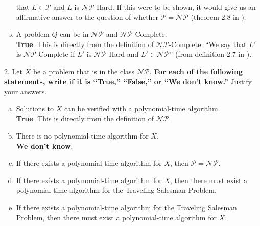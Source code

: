 \documentclass{scrartcl}
\begin{document}
\begin{flushleft}
\begin{enumerate}[(a)]
            that $L \in \mathcal{P}$ and $L$ is $\mathcal{NP}$-Hard. If this were to be shown, it
            would give us an affirmative answer to the question of whether $\mathcal{P} =
            \mathcal{NP}$ (theorem 2.8 in \cite{modernapp}).
        \item A problem $Q$ can be in $\mathcal{NP}$ and $\mathcal{NP}$-Complete.\\
            \bigskip
            \textbf{True}. This is directly from the definition of $\mathcal{NP}$-Complete: ``We say
            that $L'$ is $\mathcal{NP}$-Complete if $L'$ is $\mathcal{NP}$-Hard and $L' \in
            \mathcal{NP}$'' (from definition 2.7 in \cite{modernapp}).
    \end{enumerate}
    2. Let $X$ be a problem that is in the class $\mathcal{NP}$. \textbf{For each of the following
    statements, write if it is ``True,'' ``False,'' or ``We don't know.''} Justify your answers.\\
    \begin{enumerate}[(a)]
        \item Solutions to $X$ can be verified with a polynomial-time algorithm.\\
            \bigskip
            \textbf{True}. This is directly from the definition of $\mathcal{NP}$.
        \item There is no polynomial-time algorithm for $X$.\\
            \bigskip
            \textbf{We don't know}.
        \item If there exists a polynomial-time algorithm for $X$, then $\mathcal{P} =
            \mathcal{NP}$.
        \item If there exists a polynomial-time algorithm for $X$, then there must exist a
            polynomial-time algorithm for the Traveling Salesman Problem.
        \item If there exists a polynomial-time algorithm for the Traveling Salesman Problem, then
            there must exist a polynomial-time algorithm for $X$.
    \end{enumerate}

    
    
\end{flushleft}
\end{document}
